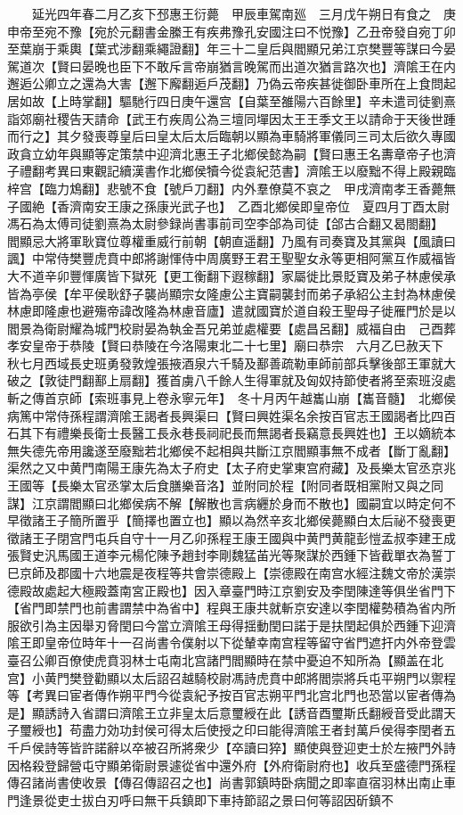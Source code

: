 　　延光四年春二月乙亥下邳惠王衍薨　甲辰車駕南廵　三月戊午朔日有食之　庚申帝至宛不豫【宛於元翻書金縢王有疾弗豫孔安國注曰不悦豫】乙丑帝發自宛丁卯至葉崩于乘輿【葉式涉翻乘繩證翻】年三十二皇后與閻顯兄弟江京樊豐等謀曰今晏駕道次【賢曰晏晚也臣下不敢斥言帝崩猶言晚駕而出道次猶言路次也】濟隂王在内邂逅公卿立之還為大害【邂下廨翻逅戶茂翻】乃偽云帝疾甚徙御卧車所在上食問起居如故【上時掌翻】驅馳行四日庚午還宫【自葉至雒陽六百餘里】辛未遣司徒劉熹詣郊廟社稷告天請命【武王冇疾周公為三壇同墠因太王王季文王以請命于天後世踵而行之】其夕發喪尊皇后曰皇太后太后臨朝以顯為車騎將軍儀同三司太后欲久專國政貪立幼年與顯等定策禁中迎濟北惠王子北鄉侯懿為嗣【賢曰惠王名夀章帝子也濟子禮翻考異曰東觀記續漢書作北鄉侯犢今從袁紀范書】濟隂王以廢黜不得上殿親臨梓宫【臨力鴆翻】悲號不食【號戶刀翻】内外羣僚莫不哀之　甲戌濟南孝王香薨無子國絶【香濟南安王康之孫康光武子也】　乙酉北鄉侯即皇帝位　夏四月丁酉太尉馮石為太傅司徒劉熹為太尉參録尚書事前司空李郃為司徒【郃古合翻又曷閤翻】　閻顯忌大將軍耿寶位尊權重威行前朝【朝直遥翻】乃風有司奏寶及其黨與【風讀曰諷】中常侍樊豐虎賁中郎將謝惲侍中周廣野王君王聖聖女永等更相阿黨互作威福皆大不道辛卯豐惲廣皆下獄死【更工衡翻下遐稼翻】家屬徙比景貶寶及弟子林慮侯承皆為亭侯【牟平侯耿舒子襲尚顯宗女隆慮公主寶嗣襲封而弟子承紹公主封為林慮侯林慮即隆慮也避殤帝諱改隆為林慮音廬】遣就國寶於道自殺王聖母子徙雁門於是以閻景為衛尉耀為城門校尉晏為執金吾兄弟並處權要【處昌呂翻】威福自由　己酉葬孝安皇帝于恭陵【賢曰恭陵在今洛陽東北二十七里】廟曰恭宗　六月乙巳赦天下　秋七月西域長史班勇發敦煌張掖酒泉六千騎及鄯善疏勒車師前部兵擊後部王軍就大破之【敦徒門翻鄯上扇翻】獲首虜八千餘人生得軍就及匈奴持節使者將至索班沒處斬之傳首京師【索班事見上卷永寧元年】　冬十月丙午越巂山崩【巂音髓】　北鄉侯病篤中常侍孫程謂濟隂王謁者長興渠曰【賢曰興姓渠名余按百官志王國謁者比四百石其下有禮樂長衛士長醫工長永巷長祠祀長而無謁者長竊意長興姓也】王以嫡統本無失德先帝用讒遂至廢黜若北鄉侯不起相與共斷江京閻顯事無不成者【斷丁亂翻】渠然之又中黄門南陽王康先為太子府史【太子府史掌東宫府藏】及長樂太官丞京兆王國等【長樂太官丞掌太后食膳樂音洛】並附同於程【附同者既相黨附又與之同謀】江京謂閻顯曰北鄉侯病不解【解散也言病纒於身而不散也】國嗣宜以時定何不早徵諸王子簡所置乎【簡擇也置立也】顯以為然辛亥北鄉侯薨顯白太后祕不發喪更徵諸王子閉宫門屯兵自守十一月乙卯孫程王康王國與中黄門黄龍彭愷孟叔李建王成張賢史汎馬國王道李元楊佗陳予趙封李剛魏猛苖光等聚謀於西鍾下皆截單衣為誓丁巳京師及郡國十六地震是夜程等共會崇德殿上【崇德殿在南宫水經注魏文帝於漢崇德殿故處起大極殿蓋南宮正殿也】因入章臺門時江京劉安及李閏陳達等俱坐省門下【省門即禁門也前書謂禁中為省中】程與王康共就斬京安達以李閏權勢積為省内所服欲引為主因舉刃脅閏曰今當立濟隂王母得揺動閏曰諾于是扶閏起俱於西鍾下迎濟隂王即皇帝位時年十一召尚書令僕射以下從輦幸南宫程等留守省門遮扞内外帝登雲臺召公卿百僚使虎賁羽林士屯南北宫諸門閻顯時在禁中憂迫不知所為【顯盖在北宫】小黄門樊登勸顯以太后詔召越騎校尉馮詩虎賁中郎將閻崇將兵屯平朔門以禦程等【考異曰宦者傳作朔平門今從袁紀予按百官志朔平門北宫北門也恐當以宦者傳為是】顯誘詩入省謂曰濟隂王立非皇太后意璽綬在此【誘音酉璽斯氏翻綬音受此謂天子璽綬也】苟盡力効功封侯可得太后使授之印曰能得濟隂王者封萬戶侯得李閏者五千戶侯詩等皆許諾辭以卒被召所將衆少【卒讀曰猝】顯使與登迎吏士於左掖門外詩因格殺登歸營屯守顯弟衛尉景遽從省中還外府【外府衛尉府也】收兵至盛德門孫程傳召諸尚書使收景【傳召傳詔召之也】尚書郭鎮時卧病聞之即率直宿羽林出南止車門逢景從吏士拔白刃呼曰無干兵鎮即下車持節詔之景曰何等詔因斫鎮不